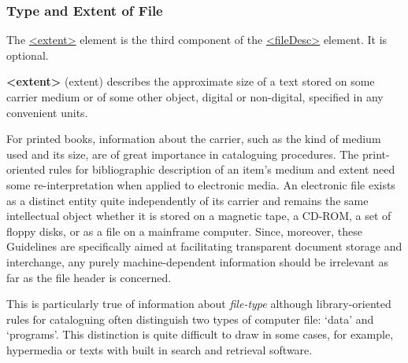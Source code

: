 \subsubsection[{Type and Extent of File}]{Type and Extent of File}\label{HD23}\par
The \hyperref[TEI.extent]{<extent>} element is the third component of the \hyperref[TEI.fileDesc]{<fileDesc>} element. It is optional. 
\begin{sansreflist}
  
\item [\textbf{<extent>}] (extent) describes the approximate size of a text stored on some carrier medium or of some other object, digital or non-digital, specified in any convenient units.
\end{sansreflist}
\par
For printed books, information about the carrier, such as the kind of medium used and its size, are of great importance in cataloguing procedures. The print-oriented rules for bibliographic description of an item's medium and extent need some re-interpretation when applied to electronic media. An electronic file exists as a distinct entity quite independently of its carrier and remains the same intellectual object whether it is stored on a magnetic tape, a CD-ROM, a set of floppy disks, or as a file on a mainframe computer. Since, moreover, these Guidelines are specifically aimed at facilitating transparent document storage and interchange, any purely machine-dependent information should be irrelevant as far as the file header is concerned. \par
This is particularly true of information about \textit{file-type} although library-oriented rules for cataloguing often distinguish two types of computer file: ‘data’ and ‘programs’. This distinction is quite difficult to draw in some cases, for example, hypermedia or texts with built in search and retrieval software.\par
